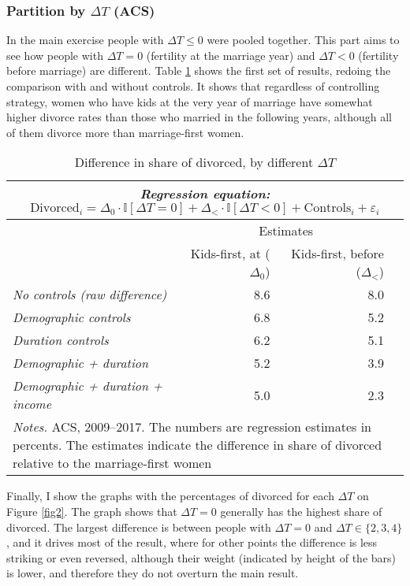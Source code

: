 \documentclass[12pt,letter]{article}
\newcommand{\I}{\mathbb{I}}
\begin{document}
\subsubsection{Partition by $\Delta T$ (ACS)}
In the main exercise people with $\Delta T \leq 0$ were pooled together. This part aims to see how people with $\Delta T = 0$ (fertility at the marriage year) and $\Delta T < 0$ (fertility before marriage) are different. Table \ref{dt_table} shows the first set of results, redoing the comparison with and without controls. It shows that regardless of controlling strategy, women who have kids at the very year of marriage have somewhat higher divorce rates than those who married in the following years, although all of them divorce more than marriage-first women.

\begin{table}[h]
\caption{Difference in share of divorced, by different $\Delta T$\label{dt_table}}
\begin{tabular}{l r r r }
\multicolumn{4}{c}{\textit{Regression equation:} $\text{Divorced}_i = \Delta_0 \cdot \I[\Delta T = 0] + \Delta_{<} \cdot \I[\Delta T < 0]  + \text{Controls}_i + \varepsilon_i$} \\\hline
\hline
& \multicolumn{2}{c}{Estimates} &   \\
& Kids-first, at ($\Delta_0$)  & Kids-first, before ($\Delta_<$)  \\\hline
\textit{No controls (raw difference) }&  8.6 &  8.0  \\
\textit{Demographic controls }& 6.8 &  5.2 \\ 
\textit{Duration controls} &  6.2 &  5.1 \\ 
\textit{Demographic + duration} &  5.2 &  3.9 \\
\textit{Demographic + duration + income} & 5.0 &  2.3  \\\hline
\multicolumn{4}{p{\linewidth}}{\footnotesize \textit{Notes.} ACS, 2009--2017. The numbers are regression estimates in percents.  The estimates indicate the difference in share of divorced relative to the marriage-first women}\\\hline\hline
\end{tabular}
\end{table}

Finally, I show the graphs with the percentages of divorced for each $\Delta T$ on Figure \ref{fig2}. The graph shows that $\Delta T = 0$ generally has the highest share of divorced. The largest difference is between people with $\Delta T = 0$ and $\Delta T \in \{2,3,4\}$, and it drives most of the result, where for other points the difference is less striking or even reversed, although their weight (indicated by height of the bars) is lower, and therefore they do not overturn the main result.
\end{document}
